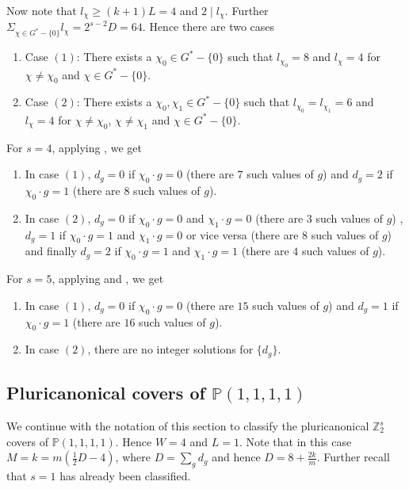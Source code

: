 \documentclass[12pt,twoside,]{amsart}
\theoremstyle{plain}
\theoremstyle{definition}
\begin{document}
Now note that $l_{\chi} \geq (k+1)L = 4$ and $2 \mid l_{\chi}$. Further $\Sigma_{\chi \in G^*-\{0\}}l_{\chi} = 2^{s-2}D = 64$. Hence there are two cases

\begin{enumerate}
    \item Case $(1)$: There exists a $\chi_0 \in G^*-\{0\}$ such that $l_{\chi_0} = 8$ and $l_{\chi} = 4$ for $\chi \neq \chi_0$ and $\chi \in G^*-\{0\}$.
    \item Case $(2)$: There exists a $\chi_0, \chi_1 \in G^*-\{0\}$ such that $l_{\chi_0} = l_{\chi_1} = 6$ and $l_{\chi} = 4$ for $\chi \neq \chi_0$, $\chi \neq \chi_1$ and $\chi \in G^*-\{0\}$.
\end{enumerate}

For $s = 4$, applying , we get 

\begin{enumerate}
    \item In case $(1)$, $d_g = 0$ if $\chi_0 \cdot g = 0$ (there are $7$ such values of $g$) and $d_g = 2$ if $\chi_0 \cdot g = 1$ (there are $8$ such values of $g$).
    \item In case $(2)$, $d_g = 0$ if $\chi_0 \cdot g = 0$ and $\chi_1 \cdot g = 0$ (there are $3$ such values of $g$) , $d_g = 1$ if $\chi_0 \cdot g = 1$ and $\chi_1 \cdot g = 0$ or vice versa (there are $8$ such values of $g$) and finally $d_g = 2$ if $\chi_0 \cdot g = 1$ and $\chi_1 \cdot g = 1$ (there are $4$ such values of $g$).
    
\end{enumerate}

For $s = 5$, applying  and , we get 

\begin{enumerate}
    \item In case $(1)$, $d_g = 0$ if $\chi_0 \cdot g = 0$ (there are $15$ such values of $g$) and $d_g = 1$ if $\chi_0 \cdot g = 1$ (there are $16$ such values of $g$).
    \item In case $(2)$, there are no integer solutions for $\{d_g\}$.
    
\end{enumerate}


\subsection{Pluricanonical covers of $\mathbb{P}(1,1,1,1)$}


We continue with the notation of this section to classify the pluricanonical $\mathbb{Z}_2^s$ covers of $\mathbb{P}(1,1,1,1)$. Hence $W = 4$ and $L = 1$. Note that in this case $M = k = m(\displaystyle\frac{1}{2}D-4)$, where $D = \sum_g d_g$ and hence $D = 8+\frac{2k}{m}$. Further recall that $s = 1$ has already been classified.
\end{document}

